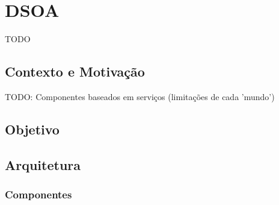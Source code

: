 \chapter{DSOA}
\label{ch:3}
TODO 
\section{Contexto e Motivação}
TODO: Componentes baseados em serviços (limitações de cada 'mundo')

\section{Objetivo}

\section{Arquitetura}

\subsection{Componentes}

